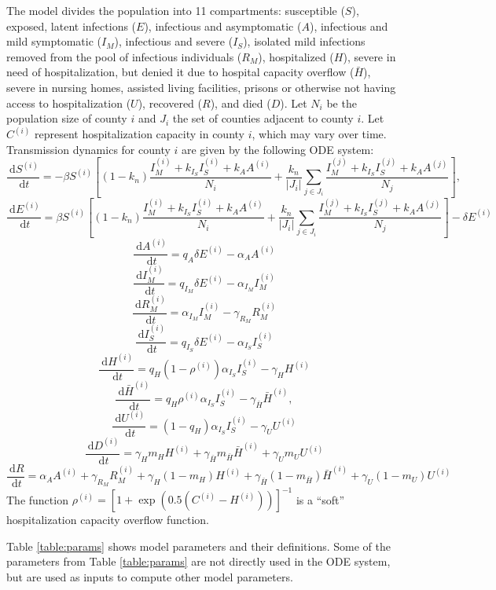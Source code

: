 \documentclass[11pt]{article}
\newcommand{\dx}[1]{\ \text{d} #1}
\begin{document}
The model divides the population into 11 compartments: susceptible ($S$), exposed, latent infections ($E$), infectious and asymptomatic ($A$), infectious and mild symptomatic ($I_M$), infectious and severe ($I_S$), isolated mild infections removed from the pool of infectious individuals ($R_M$), hospitalized ($H$), severe in need of hospitalization, but denied it due to hospital capacity overflow ($\bar{H}$), severe in nursing homes, assisted living facilities, prisons or otherwise not having access to hospitalization ($U$), recovered ($R$), and died ($D$).  Let $N_i$ be the population size of county $i$ and $J_i$ the set of counties adjacent to county $i$.  Let $C^{(i)}$ represent hospitalization capacity in county $i$, which may vary over time.  Transmission dynamics for county $i$  are given by the following ODE system: 
\[ \frac{\dx{S^{(i)}}}{\dx{t}} = -\beta S^{(i)} \left[ (1-k_n) \frac{ I_M^{(i)} + k_{I_S} I_S^{(i)} + k_A A^{(i)}}{N_i} + \frac{k_n}{|J_i|} \sum_{j\in J_i}  \frac{I_M^{(j)} + k_{I_S} I_S^{(j)} + k_A A^{(j)}}{N_j} \right], \]
\[ \frac{\dx{E^{(i)}}}{\dx{t}} = \beta S^{(i)} \left[ (1-k_n) \frac{ I_M^{(i)} + k_{I_S} I_S^{(i)} + k_A A^{(i)}}{N_i} + \frac{k_n}{|J_i|} \sum_{j\in J_i}  \frac{I_M^{(j)} + k_{I_S} I_S^{(j)} + k_A A^{(j)}}{N_j} \right] - \delta E^{(i)} \]
\[ \frac{\dx{A^{(i)}}}{\dx{t}} = q_A \delta E^{(i)} - \alpha_A A^{(i)} \]
\[ \frac{\dx{I_M^{(i)}}}{\dx{t}} = q_{I_M} \delta E^{(i)} - \alpha_{I_M} I_M^{(i)} \]
\[ \frac{\dx{R_M^{(i)}}}{\dx{t}} = \alpha_{I_M} I_M^{(i)} - \gamma_{R_M} R_M^{(i)} \]
\[ \frac{\dx{I_S^{(i)}}}{\dx{t}} = q_{I_S} \delta E^{(i)} - \alpha_{I_S} I_S^{(i)} \]
\[ \frac{\dx{H^{(i)}}}{\dx{t}} =  q_H (1 - \rho^{(i)}) \alpha_{I_S} I_S^{(i)} - \gamma_H H^{(i)}  \]
\[ \frac{\dx{\bar{H}^{(i)}}}{\dx{t}} =  q_H \rho^{(i)} \alpha_{I_S} I_S^{(i)} - \gamma_{\bar{H}} \bar{H}^{(i)},  \]
\[ \frac{\dx{U^{(i)}}}{\dx{t}} =  (1 - q_H) \alpha_{I_S} I_S^{(i)} - \gamma_{U} U^{(i)}  \]
\[ \frac{\dx{D^{(i)}}}{\dx{t}} = \gamma_H m_H H^{(i)} + \gamma_{\bar{H}}  m_{\bar{H}} \bar{H}^{(i)} + \gamma_{U} m_{U} U^{(i)} \]
\[ \frac{\dx{R}}{\dx{t}} = \alpha_A A^{(i)} + \gamma_{R_M} R_M^{(i)} + \gamma_H (1-m_H) H^{(i)} + \gamma_{\bar{H}} (1 - m_{\bar{H}}) \bar{H}^{(i)} + \gamma_{U} (1- m_{U}) U^{(i)}  \]
The function $\rho^{(i)} = \left[ 1+\exp(0.5(C^{(i)}-H^{(i)})) \right]^{-1}$ is a ``soft'' hospitalization capacity overflow function.  

Table \ref{table:params} shows model parameters and their definitions. Some of the parameters from Table \ref{table:params} are not directly used in the ODE system, but are used as inputs to compute other model parameters. 
\end{document}
